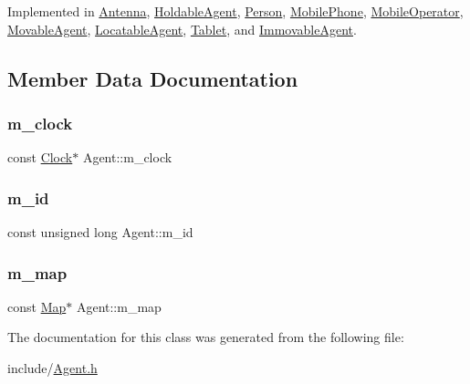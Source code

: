Implemented in \hyperlink{class_antenna_a7fea30e065f49a3cbcee02f60bd033c8}{Antenna}, \hyperlink{class_holdable_agent_a2c581226b8994f24b6b2306ae17dbb52}{Holdable\+Agent}, \hyperlink{class_person_a68872538da519d0a04297f43376db27c}{Person}, \hyperlink{class_mobile_phone_a2b7e556d12a43e380786ad0eccf3ce04}{Mobile\+Phone}, \hyperlink{class_mobile_operator_aa83724a149499ef10678ad651a5b40df}{Mobile\+Operator}, \hyperlink{class_movable_agent_a1dee2a6bf93f01006fadfb6fba6c9a59}{Movable\+Agent}, \hyperlink{class_locatable_agent_a88674f4c8ab9b1b2f3986b226bf4244f}{Locatable\+Agent}, \hyperlink{class_tablet_a3fae01e7d526699476221c6a686a4fba}{Tablet}, and \hyperlink{class_immovable_agent_a805b0d18035550d902d617a8c7ccc062}{Immovable\+Agent}.



\subsection{Member Data Documentation}
\mbox{\label{class_agent_a534f22ebb0573aa1d58d274632e592cf}} 
\subsubsection{\texorpdfstring{m\+\_\+clock}{m\_clock}}
{\footnotesize\ttfamily const \hyperlink{class_clock}{Clock}$\ast$ Agent\+::m\+\_\+clock\hspace{0.3cm}{\ttfamily [private]}}

\mbox{\label{class_agent_ad1f52e164c2a829ef4418940567d6e37}} 
\subsubsection{\texorpdfstring{m\+\_\+id}{m\_id}}
{\footnotesize\ttfamily const unsigned long Agent\+::m\+\_\+id\hspace{0.3cm}{\ttfamily [private]}}

\mbox{\label{class_agent_ab24d62bbfc22946d0c72221c8a43f04a}} 
\subsubsection{\texorpdfstring{m\+\_\+map}{m\_map}}
{\footnotesize\ttfamily const \hyperlink{class_map}{Map}$\ast$ Agent\+::m\+\_\+map\hspace{0.3cm}{\ttfamily [private]}}



The documentation for this class was generated from the following file\+:\begin{DoxyCompactItemize}
\item 
include/\hyperlink{_agent_8h}{Agent.\+h}\end{DoxyCompactItemize}
